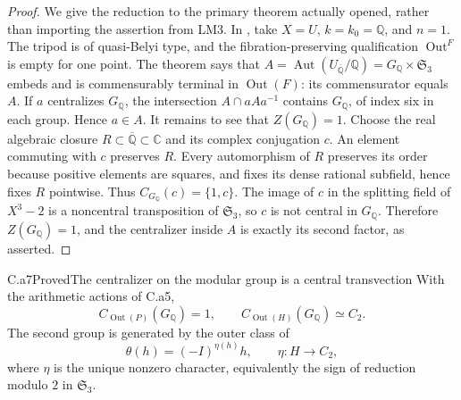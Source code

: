 \begin{proof}
We give the reduction to the primary theorem actually opened, rather
than importing the assertion from LM3. In
\citet[Corollary 6.3(iii),(iv)]{HM2011arith}, take $X=U$, $k=k_0=
\mathbb Q$, and $n=1$. The tripod is of quasi-Belyi type, and the
fibration-preserving qualification $\operatorname{Out}^{F}$ is empty
for one point. The theorem says that
$A=\operatorname{Aut}(U_{\overline{\mathbb Q}}/\mathbb Q)
=G_{\mathbb Q}\times\mathfrak S_3$ embeds and is commensurably terminal
in $\operatorname{Out}(F)$: its commensurator equals $A$.
If $a$ centralizes $G_{\mathbb Q}$, the intersection $A\cap aAa^{-1}$
contains $G_{\mathbb Q}$, of index six in each group. Hence $a\in A$.
It remains to see that $Z(G_{\mathbb Q})=1$. Choose the real algebraic
closure $R\subset\overline{\mathbb Q}\subset\mathbb C$ and its
complex conjugation $c$. An element commuting with $c$ preserves $R$.
Every automorphism of $R$ preserves its order because positive elements
are squares, and fixes its dense rational subfield, hence fixes $R$
pointwise. Thus $C_{G_{\mathbb Q}}(c)=\{1,c\}$. The image of $c$ in
the splitting field of $X^3-2$ is a noncentral transposition of
$\mathfrak S_3$, so $c$ is not central in $G_{\mathbb Q}$. Therefore
$Z(G_{\mathbb Q})=1$, and the centralizer inside $A$ is exactly its
second factor, as asserted.
\end{proof}

\begin{claim}{C.a7}{Proved}{The centralizer on the modular group is a central transvection}
With the arithmetic actions of C.a5,
\[
 C_{\operatorname{Out}(P)}(G_{\mathbb Q})=1,\qquad
 C_{\operatorname{Out}(H)}(G_{\mathbb Q})\simeq C_2.
 \tag{C.a7.1}
\]
The second group is generated by the outer class of
\[
 \theta(h)=(-I)^{\eta(h)}h,
 \qquad \eta:H\longrightarrow C_2,
 \tag{C.a7.2}
\]
where $\eta$ is the unique nonzero character, equivalently the sign of
reduction modulo $2$ in $\mathfrak S_3$.
\end{claim}

